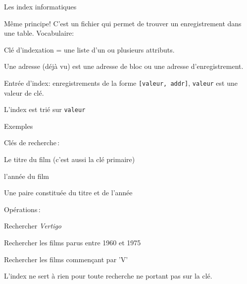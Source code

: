 \begin{frame}{Les index informatiques}

Même principe! C'est un fichier qui permet de trouver 
un enregistrement dans une table.  
 Vocabulaire:

\vfill
\begin{blocgauche}
\begin{redbullet}
  \item \alert{Clé d'indexation} = une \alert{liste}
     d'un ou plusieurs attributs.
   \item Une \alert{adresse} (déjà vu) est une adresse de bloc ou une adresse d'enregistrement.
   \item \alert{Entrée d'index}: enregistrements de la forme \texttt{[valeur, addr]}, \texttt{valeur}
     est une valeur de clé. 
  \item L'index est \alert{trié} sur \texttt{valeur}

\end{redbullet}
\end{blocgauche}

\end{frame}
\begin{frame}{Exemples}

Clés de recherche\,:
\begin{redbullet}
  \item Le titre du film (c'est aussi la clé primaire)
  \item l'année du film 
  \item Une paire constituée du  titre et de l'année  
\end{redbullet}

\vfill

Opérations\,:
\begin{redbullet}
  \item Rechercher \textit{Vertigo}
  \item Rechercher les films parus entre 1960 et 1975
  \item Rechercher les films commençant par 'V'
\end{redbullet}

\vfill
\begin{blocgauche}
\alert{L'index ne sert à rien pour toute recherche
ne portant pas sur la clé}.
\end{blocgauche}
\end{frame}

